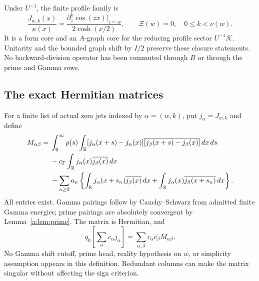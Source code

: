 \documentclass[11pt,a4paper]{article}
\numberwithin{equation}{section}
\theoremstyle{definition}\newtheorem{definition}[theorem]{Definition}
\theoremstyle{remark}\newtheorem{remark}[theorem]{Remark}
\newcommand{\R}{\mathbb R}\newcommand{\C}{\mathbb C}\newcommand{\N}{\mathbb N}
\newcommand{\Kk}{\mathcal K}\newcommand{\Aa}{\mathcal A}\newcommand{\Ff}{\mathcal F}
\begin{document}
Under $U^{-1}$, the finite profile family is
\begin{equation}\label{eq:actual-profile-jets}
 \frac{J_{w,k}(x)}{\kappa(x)}
 =\frac{\partial_z^k\cos(zx)|_{z=w}}{2\cosh(x/2)},
 \qquad \Xi(w)=0,\quad 0\le k<\nu(w).
\end{equation}
It is a form core and an $A$-graph core for the reducing profile sector $U^{-1}\Kk$. Unitarity and the bounded graph shift by $I/2$ preserve these closure statements. No backward-division operator has been commuted through $B$ or through the prime and Gamma rows.

\subsection{The exact Hermitian matrices}
For a finite list of actual zero jets indexed by $\alpha=(w,k)$, put $j_\alpha=J_{w,k}$ and define
\begin{align}\label{eq:actual-matrix}
 M_{\alpha\beta}
 ={}&\int_0^\infty\rho(s)\int_\R
 [j_\alpha(x+s)-j_\alpha(x)]
 \overline{[j_\beta(x+s)-j_\beta(x)]}\,dx\,ds\notag\\
 &-\cg\int_\R j_\alpha(x)\overline{j_\beta(x)}\,dx\notag\\
 &-\sum_{n\ge2}a_n\left\{\int_\R j_\alpha(x+s_n)\overline{j_\beta(x)}\,dx
       +\int_\R j_\alpha(x)\overline{j_\beta(x+s_n)}\,dx\right\}.
\end{align}
All entries exist. Gamma pairings follow by Cauchy--Schwarz from admitted finite Gamma energies; prime pairings are absolutely convergent by Lemma~\ref{a:lem:prime}. The matrix is Hermitian, and
\begin{equation}\label{eq:actual-quadratic}
 q_0\!\left[\sum_\alpha c_\alpha j_\alpha\right]
 =\sum_{\alpha,\beta}c_\alpha\overline{c_\beta}M_{\alpha\beta}.
\end{equation}
No Gamma shift cutoff, prime head, reality hypothesis on $w$, or simplicity assumption appears in this definition. Redundant columns can make the matrix singular without affecting the sign criterion.
\end{document}
